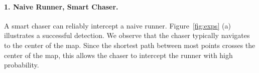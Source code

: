 \documentclass[twoside]{article}
\begin{document}



\paragraph{1. Naive Runner, Smart Chaser.} A smart chaser can reliably intercept a naive runner. 
Figure~\ref{fig:exps} (a) illustrates a successful detection. We observe that the chaser typically navigates to the center of the map. Since the shortest path between most points crosses the center of the map, this allows the chaser to intercept the runner with high probability.
\end{document}
